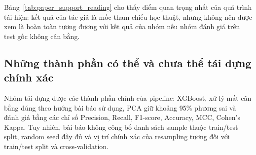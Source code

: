 \begin{table}[H]
\centering
\small
\caption{Kết quả của tác giả}
\label{tab:paper_support_reading}
\end{table}

Bảng~\ref{tab:paper_support_reading} cho thấy điểm quan trọng nhất của quá trình tái hiện: kết quả của tác giả là mốc tham chiếu học thuật, nhưng không nên được xem là hoàn toàn tương đương với kết quả của nhóm nếu nhóm đánh giá trên test gốc không cân bằng.

\subsection{Những thành phần có thể và chưa thể tái dựng chính xác}

Nhóm tái dựng được các thành phần chính của pipeline: XGBoost, xử lý mất cân bằng đúng theo hướng bài báo sử dụng, PCA giữ khoảng 95\% phương sai và đánh giá bằng các chỉ số Precision, Recall, F1-score, Accuracy, MCC, Cohen's Kappa. Tuy nhiên, bài báo không công bố danh sách sample thuộc train/test split, random seed đầy đủ và vị trí chính xác của resampling tương đối với train/test split và cross-validation.


